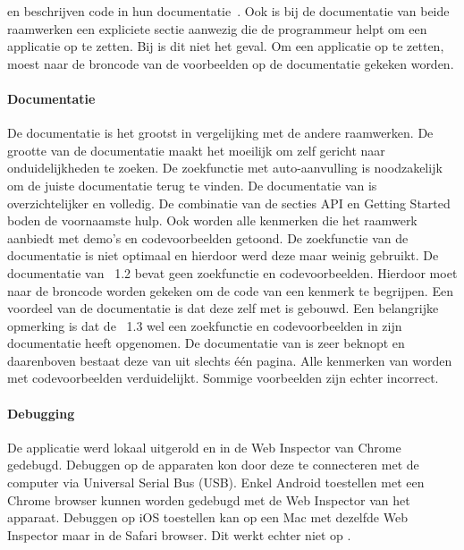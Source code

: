 \jqm{} en \kendo{} beschrijven  code in hun documentatie~\cite{JQuery2012b,Telerikd}.
Ook is bij de documentatie van beide raamwerken een expliciete sectie aanwezig die de programmeur helpt om een applicatie op te zetten.
Bij \lungo{} is dit niet het geval.  
Om een \lungo{} applicatie op te zetten, moest naar de broncode van de voorbeelden op de documentatie gekeken worden.

\paragraph{Documentatie}
De \st{} documentatie is het grootst in vergelijking met de andere raamwerken.
De grootte van de documentatie maakt het moeilijk om zelf gericht naar onduidelijkheden te zoeken.
De zoekfunctie met auto-aanvulling is noodzakelijk om de juiste documentatie terug te vinden.
De documentatie van \kendo{} is overzichtelijker en volledig.
De combinatie van de secties API en Getting Started boden de voornaamste hulp.
Ook worden alle kenmerken die het raamwerk aanbiedt met demo's en codevoorbeelden getoond.
De zoekfunctie van de documentatie is niet optimaal en hierdoor werd deze maar weinig gebruikt.
De documentatie van \jqm{}~1.2 bevat geen zoekfunctie en codevoorbeelden.
Hierdoor moet naar de broncode worden gekeken om de code van een kenmerk te begrijpen.
Een voordeel van de \jqm{} documentatie is dat deze zelf met \jqm{} is gebouwd.
Een belangrijke opmerking is dat de \jqm{}~1.3 wel een zoekfunctie en codevoorbeelden in zijn documentatie heeft opgenomen.
De documentatie van \lungo{} is zeer beknopt en daarenboven bestaat deze van \quo{} uit slechts één pagina.
Alle kenmerken van \lungo{} worden met codevoorbeelden verduidelijkt.
Sommige voorbeelden zijn echter incorrect.

\paragraph{Debugging}
De applicatie werd lokaal uitgerold en in de Web Inspector van Chrome gedebugd.
Debuggen op de apparaten kon door deze te connecteren met de computer via Universal Serial Bus (USB).
Enkel Android toestellen met een Chrome browser kunnen worden gedebugd met de Web Inspector van het apparaat.
Debuggen op iOS toestellen kan op een Mac met dezelfde Web Inspector maar in de Safari browser.
Dit werkt echter niet op \ipadi{}.

